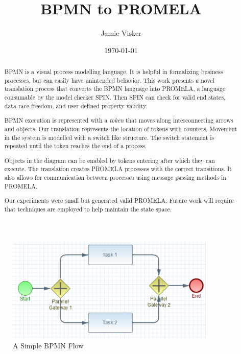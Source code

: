 \documentclass[11pt,twocolumn]{article}
\title{BPMN to PROMELA}
\author{Jamie Visker}
\date{\today}
\begin{document}
\maketitle


\begin{abstract}
BPMN is a visual process modelling language. It is helpful in formalizing business processes, but can easily have unintended behavior. This work presents a novel translation process that converts the BPMN language into PROMELA, a language consumable by the model checker SPIN. Then SPIN can check for valid end states, data-race freedom, and user defined property validity.

BPMN execution is represented with a \emph{token} that moves along interconnecting arrows and objects. Our translation represents the location of tokens with counters. Movement in the system is modelled with a switch like structure. The switch statement is repeated until the token reaches the end of a process.

Objects in the diagram can be enabled by tokens entering after which they can execute. The translation creates PROMELA processes with the correct transitions. It also allows for communication between processes using message passing methods in PROMELA.

Our experiments were small but generated valid PROMELA. Future work will require that techniques are employed to help maintain the state space.
\end{abstract}

\begin{figure}
 \begin{center}
  \includegraphics[width=100mm]{simpleFlow}
  \end{center}
  \caption{A Simple BPMN Flow}
  \label{fig:simpleFlow}
\end{figure}
\end{document}
